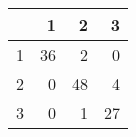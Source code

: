 \begin{tabular}{rrrr}
  \hline
 & 1 & 2 & 3 \\ 
  \hline
1 &  36 &   2 &   0 \\ 
  2 &   0 &  48 &   4 \\ 
  3 &   0 &   1 &  27 \\ 
   \hline
\end{tabular}
